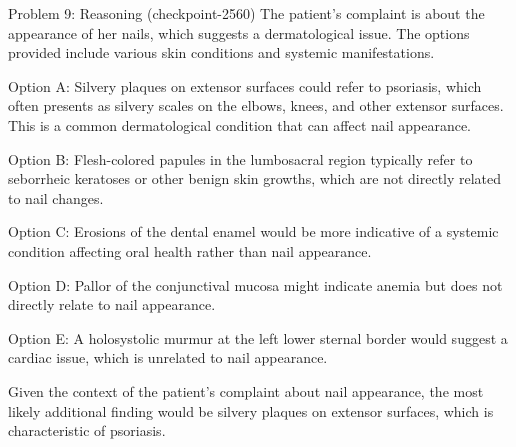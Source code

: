 \documentclass{beamer}
\begin{document}
\begin{frame}[allowframebreaks]{Problem 9: Reasoning (checkpoint-2560)}
    \small The patient's complaint is about the appearance of her nails, which suggests a dermatological issue. The options provided include various skin conditions and systemic manifestations. 

\medskip
Option A: Silvery plaques on extensor surfaces could refer to psoriasis, which often presents as silvery scales on the elbows, knees, and other extensor surfaces. This is a common dermatological condition that can affect nail appearance.

\medskip
Option B: Flesh-colored papules in the lumbosacral region typically refer to seborrheic keratoses or other benign skin growths, which are not directly related to nail changes.

\medskip
Option C: Erosions of the dental enamel would be more indicative of a systemic condition affecting oral health rather than nail appearance.

\medskip
Option D: Pallor of the conjunctival mucosa might indicate anemia but does not directly relate to nail appearance.

\medskip
Option E: A holosystolic murmur at the left lower sternal border would suggest a cardiac issue, which is unrelated to nail appearance.

\medskip
Given the context of the patient's complaint about nail appearance, the most likely additional finding would be silvery plaques on extensor surfaces, which is characteristic of psoriasis.
\end{frame}
\end{document}
